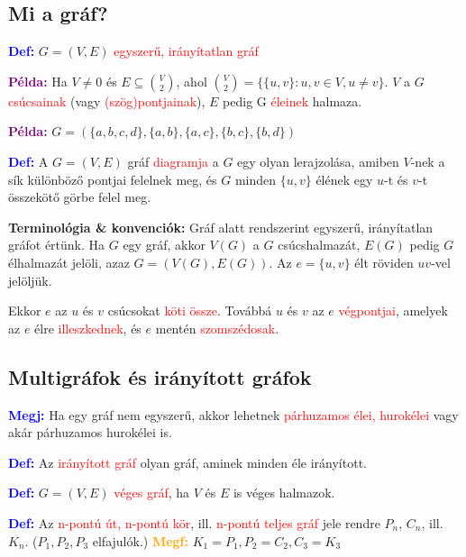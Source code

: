 \documentclass[../szamtud.tex]{subfiles}
\begin{document}
    \subsection{Mi a gráf?}

        \textcolor{blue}{\textbf{Def:}} $G = (V,E)$ \textcolor{red}{egyszerű, irányítatlan gráf}

        \textcolor{purple}{\textbf{Példa:}} Ha $ V \neq 0$ és $E \subseteq \binom{V}{2}$, ahol $\binom{V}{2} = \{\{u,v\} : u,v \in V, u \neq v\}$. $V$ a $G$ \textcolor{red}{csúcsainak} (vagy \textcolor{red}{(szög)pontjainak}), $E$ pedig G \textcolor{red}{éleinek} halmaza.

        \textcolor{purple}{\textbf{Példa:}} $G = (\{a,b,c,d\},\{a,b\},\{a,c\},\{b,c\},\{b,d\})$

        \textcolor{blue}{\textbf{Def:}} A $G = (V,E)$ gráf \textcolor{red}{diagramja} a $G$ egy olyan lerajzolása, amiben $V$-nek a sík különböző pontjai felelnek meg, és $G$ minden $\{u,v\}$ élének egy $u$-t és $v$-t összekötő görbe felel meg.

        \textbf{Terminológia \& konvenciók:} Gráf alatt rendszerint egyszerű, irányítatlan gráfot értünk. Ha $G$ egy gráf, akkor $V(G)$ a $G$ csúcshalmazát, $E(G)$ pedig $G$ élhalmazát jelöli, azaz $G = (V(G),E(G))$. Az $e = \{u,v\}$ élt röviden $uv$-vel jelöljük.

        Ekkor $e$ az $u$ és $v$ csúcsokat \textcolor{red}{köti össze}. Továbbá $u$ és $v$ az $e$ \textcolor{red}{végpontjai}, amelyek az $e$ élre \textcolor{red}{illeszkednek}, és $e$ mentén \textcolor{red}{szomszédosak}.

    \subsection{Multigráfok és irányított gráfok}

        \textcolor{blue}{\textbf{Megj:}} Ha egy gráf nem egyszerű, akkor lehetnek \textcolor{red}{párhuzamos élei, hurokélei} vagy akár párhuzamos hurokélei is.

        \textcolor{blue}{\textbf{Def:}} Az \textcolor{red}{irányított gráf} olyan gráf, aminek minden éle irányított.

        \textcolor{blue}{\textbf{Def:}} $G = (V,E)$ \textcolor{red}{véges gráf}, ha $V$ és $E$ is véges halmazok.

        \textcolor{blue}{\textbf{Def:}} Az \textcolor{red}{n-pontú út, n-pontú kör}, ill. \textcolor{red}{n-pontú teljes gráf} jele rendre $P_n$, $C_n$, ill. $K_n$. ($P_1,P_2,P_3$ elfajulók.) \textcolor{orange}{\textbf{Megf:}} $K_1 = P_1, P_2=C_2, C_3=K_3$
\end{document}
